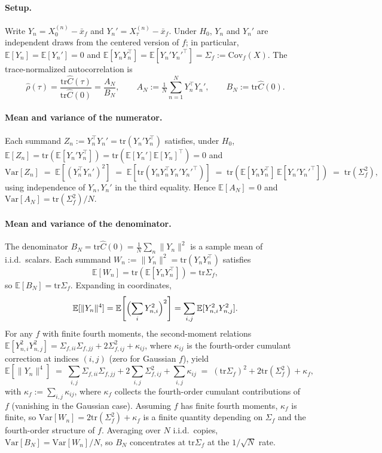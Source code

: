 \documentclass{article}
\newcommand{\E}{\mathbb{E}}
\newcommand{\Var}{\mathrm{Var}}
\newcommand{\Cov}{\mathrm{Cov}}
\newcommand{\tr}{\mathrm{tr}}
\begin{document}
\paragraph{Setup.} Write $Y_n = X_0^{(n)} - \bar x_f$ and
$Y_n' = X_\tau^{(n)} - \bar x_f$. Under $H_0$, $Y_n$ and $Y_n'$ are
independent draws from the centered version of $f$; in particular,
$\E[Y_n] = \E[Y_n'] = 0$ and
$\E[Y_n Y_n^\top] = \E[Y_n' Y_n'^\top] = \Sigma_f := \Cov_f(X)$. The
trace-normalized autocorrelation is
\[
\hat\rho(\tau)
= \frac{\tr \hat C(\tau)}{\tr \hat C(0)}
= \frac{A_N}{B_N}, \qquad
A_N := \tfrac{1}{N}\sum_{n=1}^N Y_n^\top Y_n', \qquad
B_N := \tr \hat C(0).
\]

\paragraph{Mean and variance of the numerator.}
Each summand $Z_n := Y_n^\top Y_n' = \tr(Y_n' Y_n^\top)$ satisfies, under $H_0$,
$\E[Z_n] = \tr(\E[Y_n' Y_n^\top]) = \tr(\E[Y_n']\E[Y_n]^\top) = 0$ and
\[
\Var[Z_n]
\;=\; \E[(Y_n^\top Y_n')^2]
\;=\; \E[\tr(Y_n Y_n^\top Y_n' Y_n'^\top)]
\;=\; \tr(\E[Y_n Y_n^\top]\,\E[Y_n' Y_n'^\top])
\;=\; \tr(\Sigma_f^2),
\]
using independence of $Y_n, Y_n'$ in the third equality. Hence
$\E[A_N] = 0$ and $\Var[A_N] = \tr(\Sigma_f^2)/N$.

\paragraph{Mean and variance of the denominator.}
The denominator $B_N = \tr \hat C(0) = \tfrac{1}{N}\sum_n \|Y_n\|^2$ is a
sample mean of i.i.d.\ scalars. Each summand $W_n := \|Y_n\|^2 = \tr(Y_n Y_n^\top)$
satisfies
\[
\E[W_n] = \tr(\E[Y_n Y_n^\top]) = \tr\Sigma_f,
\]
so $\E[B_N] = \tr\Sigma_f$. Expanding in coordinates,
\[
\E[\|Y_n\|^4] = \E\!\left[\Bigl(\sum_i Y_{n,i}^2\Bigr)^2\right] = \sum_{i,j} \E[Y_{n,i}^2 Y_{n,j}^2].
\]
For any $f$ with finite fourth moments, the second-moment relations
$\E[Y_{n,i}^2 Y_{n,j}^2] = \Sigma_{f,ii}\Sigma_{f,jj} + 2\Sigma_{f,ij}^2 + \kappa_{ij}$,
where $\kappa_{ij}$ is the fourth-order cumulant correction at indices
$(i,j)$ (zero for Gaussian $f$), yield
\[
\E[\|Y_n\|^4] \;=\; \sum_{i,j} \Sigma_{f,ii}\Sigma_{f,jj} + 2\sum_{i,j}\Sigma_{f,ij}^2 + \sum_{i,j}\kappa_{ij}
\;=\; (\tr\Sigma_f)^2 + 2\tr(\Sigma_f^2) + \kappa_f,
\]
with $\kappa_f := \sum_{i,j}\kappa_{ij}$, where
$\kappa_f$ collects the fourth-order cumulant contributions of $f$
(vanishing in the Gaussian case). Assuming $f$ has finite fourth
moments, $\kappa_f$ is finite, so
$\Var[W_n] = 2\tr(\Sigma_f^2) + \kappa_f$ is a finite quantity
depending on $\Sigma_f$ and the fourth-order structure of $f$.
Averaging over $N$ i.i.d.\ copies, $\Var[B_N] = \Var[W_n]/N$, so $B_N$
concentrates at $\tr\Sigma_f$ at the $1/\sqrt{N}$ rate.
\end{document}
